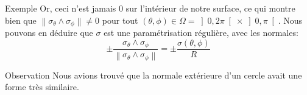 \documentclass[a4paper]{article}
\begin{document}
\begin{parag}{Exemple}
    Or, ceci n'est jamais 0 sur l'intérieur de notre surface, ce qui montre bien que $\left\|\sigma_{\theta} \wedge \sigma_{\phi}\right\| \neq 0$ pour tout $\left(\theta, \phi\right) \in \Omega = \left]0, 2\pi\right[ \times\left]0, \pi\right[$. Nous pouvons en déduire que $\sigma$ est une paramétrisation régulière, avec les normales: 
    \[\pm \frac{\sigma_{\theta} \wedge \sigma_{\phi}}{\left\|\sigma_{\theta} \wedge \sigma_{\phi}\right\|} = \pm \frac{\sigma\left(\theta, \phi\right)}{R}\]
    
    \begin{subparag}{Observation}
        Nous avions trouvé que la normale extérieure d'un cercle avait une forme très similaire.
    \end{subparag}
    
\end{parag}
\end{document}
